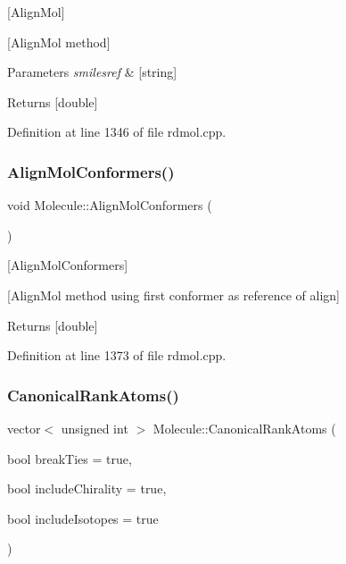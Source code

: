 \mbox{[}Align\+Mol\mbox{]} 

\mbox{[}Align\+Mol method\mbox{]}


\begin{DoxyParams}{Parameters}
{\em smilesref} & \mbox{[}string\mbox{]} \\
\hline
\end{DoxyParams}
\begin{DoxyReturn}{Returns}
\mbox{[}double\mbox{]} 
\end{DoxyReturn}


Definition at line 1346 of file rdmol.\+cpp.

\mbox{\label{class_molecule_adc6886a60ec1e7f55ba07d7f2be72e68}} 
\subsubsection{\texorpdfstring{Align\+Mol\+Conformers()}{AlignMolConformers()}}
{\footnotesize\ttfamily void Molecule\+::\+Align\+Mol\+Conformers (\begin{DoxyParamCaption}{ }\end{DoxyParamCaption})}



\mbox{[}Align\+Mol\+Conformers\mbox{]} 

\mbox{[}Align\+Mol method using first conformer as reference of align\mbox{]}

\begin{DoxyReturn}{Returns}
\mbox{[}double\mbox{]} 
\end{DoxyReturn}


Definition at line 1373 of file rdmol.\+cpp.

\mbox{\label{class_molecule_abc491241d48487fac42166ff81c0289c}} 
\subsubsection{\texorpdfstring{Canonical\+Rank\+Atoms()}{CanonicalRankAtoms()}}
{\footnotesize\ttfamily vector$<$ unsigned int $>$ Molecule\+::\+Canonical\+Rank\+Atoms (\begin{DoxyParamCaption}\item[{bool}]{break\+Ties = {\ttfamily true},  }\item[{bool}]{include\+Chirality = {\ttfamily true},  }\item[{bool}]{include\+Isotopes = {\ttfamily true} }\end{DoxyParamCaption})}



